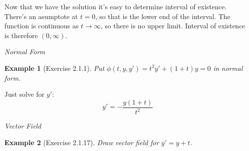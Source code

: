 \documentclass[14pt]{article}
\newtheorem{ex}{Example}
\begin{document}
Now that we have the solution it's easy to determine interval of existence. There's an asumptote at
$t=0$, so that is the lower end of the interval. The function is continuous as $t \to \infty$, so
there is no upper limit. Interval of existence is therefore $(0,\infty)$.

\emph{Normal Form}
\begin{ex}[Exercise 2.1.1] Put $\phi(t,y,y') = t^2 y' + (1+t) y = 0$ in normal form. \end{ex}
Just solve for $y'$: 
\[y' = - \frac{y(1+t)}{t^2} \]


\emph{Vector Field}
\begin{ex}[Exercise 2.1.17] Draw vector field for $y' = y+ t$. \end{ex}
\end{document}
